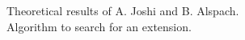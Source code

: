 \documentclass[preview]{standalone}
\begin{document}
Theoretical results of A. Joshi and B. Alspach.\\Algorithm to search for an extension.\\
\end{document}
